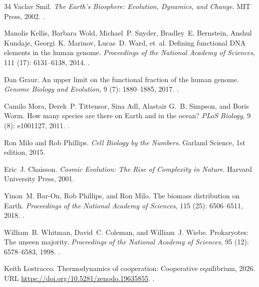 \documentclass[11pt]{article}
\theoremstyle{plain}
\theoremstyle{definition}
\theoremstyle{remark}
\begin{document}
\begin{thebibliography}{34}
Vaclav Smil.
\newblock \emph{The Earth's Biosphere: Evolution, Dynamics, and Change}.
\newblock MIT Press, 2002.
\newblock {}.

Manolis Kellis, Barbara Wold, Michael~P. Snyder, Bradley~E. Bernstein, Anshul
  Kundaje, Georgi~K. Marinov, Lucas~D. Ward, et~al.
\newblock Defining functional {DNA} elements in the human genome.
\newblock \emph{Proceedings of the National Academy of Sciences}, 111
  (17): 6131--6138, 2014.
\newblock {}.

Dan Graur.
\newblock An upper limit on the functional fraction of the human genome.
\newblock \emph{Genome Biology and Evolution}, 9 (7):
  1880--1885, 2017.
\newblock {}.

Camilo Mora, Derek~P. Tittensor, Sina Adl, Alastair G.~B. Simpson, and Boris
  Worm.
\newblock How many species are there on {Earth} and in the ocean?
\newblock \emph{PLoS Biology}, 9 (8): e1001127, 2011.
\newblock {}.

Ron Milo and Rob Phillips.
\newblock \emph{Cell Biology by the Numbers}.
\newblock Garland Science, 1st edition, 2015.

Eric~J. Chaisson.
\newblock \emph{Cosmic Evolution: The Rise of Complexity in Nature}.
\newblock Harvard University Press, 2001.

Yinon~M. Bar-On, Rob Phillips, and Ron Milo.
\newblock The biomass distribution on {Earth}.
\newblock \emph{Proceedings of the National Academy of Sciences}, 115
  (25): 6506--6511, 2018.
\newblock {}.

William~B. Whitman, David~C. Coleman, and William~J. Wiebe.
\newblock Prokaryotes: The unseen majority.
\newblock \emph{Proceedings of the National Academy of Sciences}, 95
  (12): 6578--6583, 1998.
\newblock {}.

Keith Lostracco.
\newblock Thermodynamics of cooperation: Cooperative equilibrium,
  2026{}.
\newblock URL \url{https://doi.org/10.5281/zenodo.19635855}.
\newblock {}.


\end{thebibliography}
\end{document}
